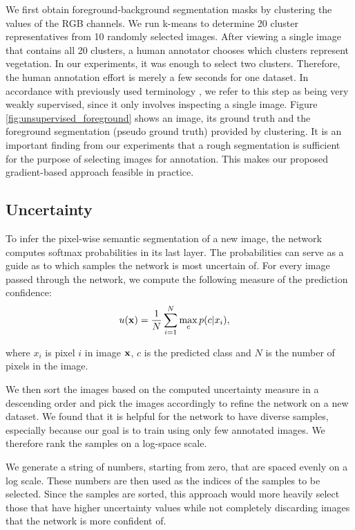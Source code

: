 \documentclass[letterpaper, 10 pt, conference]{ieeeconf}  %
\begin{document}
We first obtain foreground-background segmentation masks by clustering the values of the RGB channels. We run k-means to determine 20 cluster representatives from 10 randomly selected images. After viewing a single image that contains all 20 clusters, a human annotator chooses which clusters represent vegetation. In our experiments, it was enough to select two clusters. Therefore, the human annotation effort is merely a few seconds for one dataset. In accordance with previously used terminology \cite{zhang2018self}, we refer to this step as being very weakly supervised, since it only involves inspecting a single image. Figure  \ref{fig:unsupervised_foreground} shows an image, its ground truth and the foreground segmentation (pseudo ground truth) provided by clustering. It is an important finding from our experiments that a rough segmentation is sufficient for the purpose of selecting images for annotation. This makes our proposed gradient-based approach feasible in practice.


\subsection{Uncertainty}

To infer the pixel-wise semantic segmentation of a new image, the network computes softmax probabilities in its last layer. The probabilities can serve as a guide as to which samples the network is most uncertain of. For every image passed through the network, we compute the following measure of the prediction confidence:
\begin{align}
u(\bold{x}) &= \frac{1}{N} \sum_{i=1}^N \max_c p(c|x_i),
\end{align}  

where $x_i$ is pixel $i$ in image $\bold{x}$, $c$ is the predicted class and $N$ is the number of pixels in the image.

We then sort the images based on the computed uncertainty measure in a descending order and pick the images accordingly to refine the network on a new dataset. We found that it is helpful for the network to have diverse samples, especially because our goal is to train using only few annotated images. We therefore rank the samples on a log-space scale.

We generate a string of numbers, starting from zero, that are spaced evenly on a log scale. These numbers are then used as the indices of the samples to be selected. Since the samples are sorted, this approach would more heavily select those that have higher uncertainty values while not completely discarding images that the network is more confident of.
\end{document}
